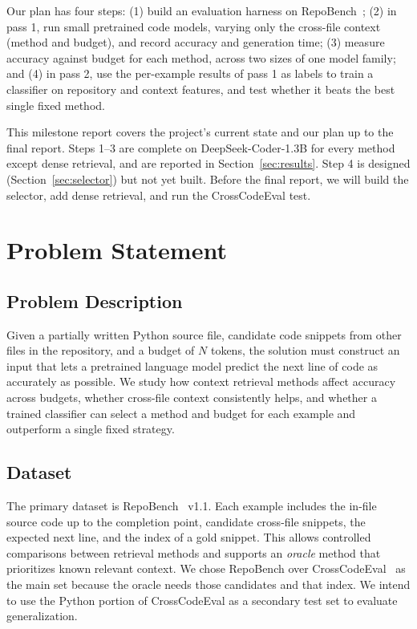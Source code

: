 \documentclass[10pt,twocolumn,letterpaper]{article}
\begin{document}
Our plan has four steps: (1) build an evaluation harness on
RepoBench~\cite{liu2023repobench}; (2) in pass 1, run small pretrained code models, varying
only the cross-file context (method and budget), and record accuracy and generation time;
(3) measure accuracy against budget for each method, across two sizes of one model family;
and (4) in pass 2, use the per-example results of pass 1 as labels to train a classifier on
repository and context features, and test whether it beats the best single fixed method.

This milestone report covers the project's current state and our plan up to the final
report. Steps 1--3 are complete on DeepSeek-Coder-1.3B for every method except dense
retrieval, and are reported in Section~\ref{sec:results}. Step 4 is designed
(Section~\ref{sec:selector}) but not yet built. Before the final report, we will build the
selector, add dense retrieval, and run the CrossCodeEval test.

\section{Problem Statement}

\subsection{Problem Description}

Given a partially written Python source file, candidate code snippets from other files in
the repository, and a budget of $N$ tokens, the solution must construct an input that lets a
pretrained language model predict the next line of code as accurately as possible. We study
how context retrieval methods affect accuracy across budgets, whether cross-file context
consistently helps, and whether a trained classifier can select a method and budget for each
example and outperform a single fixed strategy.

\subsection{Dataset}

The primary dataset is RepoBench~\cite{liu2023repobench} v1.1. Each example includes the
in-file source code up to the completion point, candidate cross-file snippets, the expected
next line, and the index of a gold snippet. This allows controlled comparisons between
retrieval methods and supports an \emph{oracle} method that prioritizes known relevant
context. We chose RepoBench over CrossCodeEval~\cite{ding2023crosscodeeval} as the main set
because the oracle needs those candidates and that index. We intend to use the Python portion
of CrossCodeEval as a secondary test set to evaluate generalization.
\end{document}
